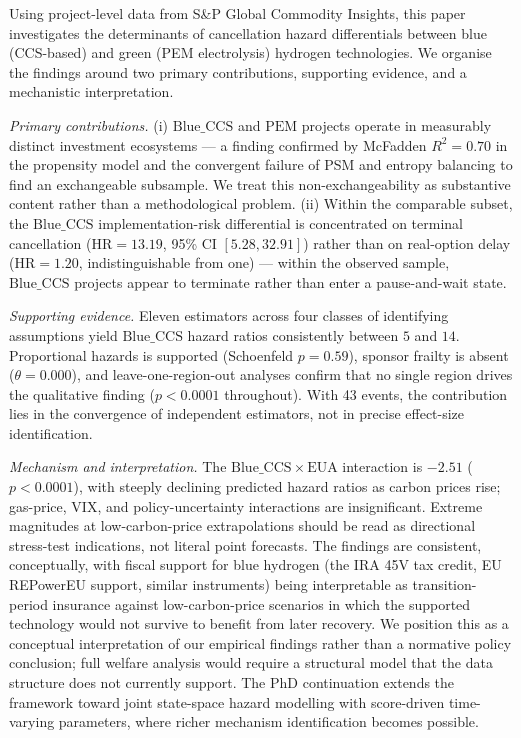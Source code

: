 \documentclass[review,authoryear,11pt]{elsarticle}
\newcommand{\HR}{\mathrm{HR}}
\newcommand{\BlueCCS}{\mathrm{Blue\_CCS}}
\newcommand{\PEM}{\mathrm{PEM}}
\newcommand{\EUA}{\mathrm{EUA}}
\begin{document}
Using project-level data from S\&P Global Commodity Insights, this paper investigates the determinants of cancellation hazard differentials between blue (CCS-based) and green (PEM electrolysis) hydrogen technologies. We organise the findings around two primary contributions, supporting evidence, and a mechanistic interpretation.

\textit{Primary contributions.} (i) $\BlueCCS$ and $\PEM$ projects operate in measurably distinct investment ecosystems --- a finding confirmed by McFadden $R^2 = 0.70$ in the propensity model and the convergent failure of PSM and entropy balancing to find an exchangeable subsample. We treat this non-exchangeability as substantive content rather than a methodological problem. (ii) Within the comparable subset, the $\BlueCCS$ implementation-risk differential is concentrated on terminal cancellation ($\HR = 13.19$, 95\% CI $[5.28, 32.91]$) rather than on real-option delay ($\HR = 1.20$, indistinguishable from one) --- within the observed sample, $\BlueCCS$ projects appear to terminate rather than enter a pause-and-wait state.

\textit{Supporting evidence.} Eleven estimators across four classes of identifying assumptions yield $\BlueCCS$ hazard ratios consistently between $5$ and $14$. Proportional hazards is supported (Schoenfeld $p = 0.59$), sponsor frailty is absent ($\theta = 0.000$), and leave-one-region-out analyses confirm that no single region drives the qualitative finding ($p < 0.0001$ throughout). With 43 events, the contribution lies in the convergence of independent estimators, not in precise effect-size identification.

\textit{Mechanism and interpretation.} The $\BlueCCS \times \EUA$ interaction is $-2.51$ ($p < 0.0001$), with steeply declining predicted hazard ratios as carbon prices rise; gas-price, VIX, and policy-uncertainty interactions are insignificant. Extreme magnitudes at low-carbon-price extrapolations should be read as directional stress-test indications, not literal point forecasts. The findings are consistent, conceptually, with fiscal support for blue hydrogen (the IRA 45V tax credit, EU REPowerEU support, similar instruments) being interpretable as transition-period insurance against low-carbon-price scenarios in which the supported technology would not survive to benefit from later recovery. We position this as a conceptual interpretation of our empirical findings rather than a normative policy conclusion; full welfare analysis would require a structural model that the data structure does not currently support. The PhD continuation extends the framework toward joint state-space hazard modelling with score-driven time-varying parameters, where richer mechanism identification becomes possible.
\end{document}
